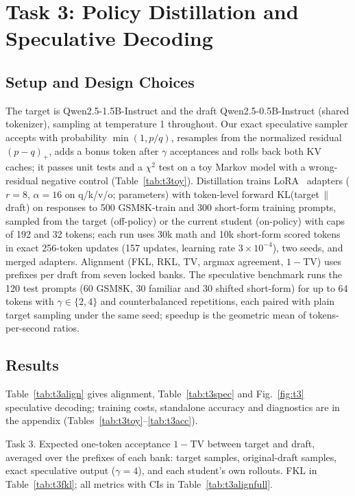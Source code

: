 \documentclass{article}
\newcommand{\tab}[1]{\begin{adjustbox}{max width=\linewidth}\end{adjustbox}}
\begin{document}
\section{Task 3: Policy Distillation and Speculative Decoding}
\label{sec:task3}
\subsection{Setup and Design Choices}
The target is Qwen2.5-1.5B-Instruct and the draft Qwen2.5-0.5B-Instruct (shared tokenizer), sampling at temperature 1
throughout. Our exact speculative sampler accepts with probability $\min(1,p/q)$, resamples from the normalized residual
$(p-q)_+$, adds a bonus token after $\gamma$ acceptances and rolls back both KV caches; it passes \TThreeUnitTests{} unit
tests and a $\chi^2$ test on a toy Markov model with a wrong-residual negative control (Table~\ref{tab:t3toy}). Distillation
trains LoRA~\citep{hu2022lora} adapters ($r=8$, $\alpha=16$ on q/k/v/o; \TThreeTrainable{} parameters) with token-level
forward KL(target$\,\|\,$draft) on responses to 500 GSM8K-train and 300 short-form training prompts, sampled from the target
(off-policy) or the current student (on-policy) with caps of 192 and 32 tokens; each run uses 30k math and 10k
short-form scored tokens in exact 256-token updates (157 updates, learning rate $3\times10^{-4}$), two seeds, and merged
adapters. Alignment (FKL, RKL, TV, argmax agreement, $1-$TV) uses \TThreeAlignPrefixes{} prefixes per draft from seven
locked banks. The speculative benchmark runs the 120 test prompts (60 GSM8K, 30 familiar and 30 shifted short-form) for up
to 64 tokens with $\gamma\in\{2,4\}$ and \TThreeSpecReps{} counterbalanced repetitions, each paired with plain target
sampling under the same seed; speedup is the geometric mean of tokens-per-second ratios.

\subsection{Results}
Table~\ref{tab:t3align} gives alignment, Table~\ref{tab:t3spec} and Fig.~\ref{fig:t3} speculative decoding; training costs,
standalone accuracy and diagnostics are in the appendix (Tables~\ref{tab:t3toy}--\ref{tab:t3acc}).

\begin{table}[!tb]
\centering\footnotesize
\caption{Task 3. Expected one-token acceptance $1-$TV between target and draft, averaged over the prefixes of each bank:
target samples, original-draft samples, exact speculative output ($\gamma=4$), and each student's own rollouts.
FKL in Table~\ref{tab:t3fkl}; all metrics with CIs in Table~\ref{tab:t3alignfull}.}
\label{tab:t3align}
\tab{t3_align_accept}
\end{table}
\end{document}
